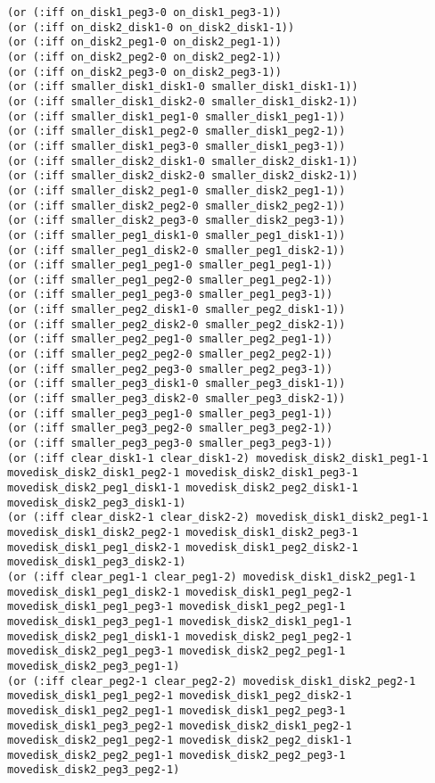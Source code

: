 \documentclass[12pt,letterpaper]{ntdhw}
\begin{document}
\begin{enumerate}
\begin{enumerate}
\begin{lstlisting}[language=pddl, style=pddlstyle,
  basicstyle=\scriptsize]
(or (:iff on_disk1_peg3-0 on_disk1_peg3-1))
(or (:iff on_disk2_disk1-0 on_disk2_disk1-1))
(or (:iff on_disk2_peg1-0 on_disk2_peg1-1))
(or (:iff on_disk2_peg2-0 on_disk2_peg2-1))
(or (:iff on_disk2_peg3-0 on_disk2_peg3-1))
(or (:iff smaller_disk1_disk1-0 smaller_disk1_disk1-1))
(or (:iff smaller_disk1_disk2-0 smaller_disk1_disk2-1))
(or (:iff smaller_disk1_peg1-0 smaller_disk1_peg1-1))
(or (:iff smaller_disk1_peg2-0 smaller_disk1_peg2-1))
(or (:iff smaller_disk1_peg3-0 smaller_disk1_peg3-1))
(or (:iff smaller_disk2_disk1-0 smaller_disk2_disk1-1))
(or (:iff smaller_disk2_disk2-0 smaller_disk2_disk2-1))
(or (:iff smaller_disk2_peg1-0 smaller_disk2_peg1-1))
(or (:iff smaller_disk2_peg2-0 smaller_disk2_peg2-1))
(or (:iff smaller_disk2_peg3-0 smaller_disk2_peg3-1))
(or (:iff smaller_peg1_disk1-0 smaller_peg1_disk1-1))
(or (:iff smaller_peg1_disk2-0 smaller_peg1_disk2-1))
(or (:iff smaller_peg1_peg1-0 smaller_peg1_peg1-1))
(or (:iff smaller_peg1_peg2-0 smaller_peg1_peg2-1))
(or (:iff smaller_peg1_peg3-0 smaller_peg1_peg3-1))
(or (:iff smaller_peg2_disk1-0 smaller_peg2_disk1-1))
(or (:iff smaller_peg2_disk2-0 smaller_peg2_disk2-1))
(or (:iff smaller_peg2_peg1-0 smaller_peg2_peg1-1))
(or (:iff smaller_peg2_peg2-0 smaller_peg2_peg2-1))
(or (:iff smaller_peg2_peg3-0 smaller_peg2_peg3-1))
(or (:iff smaller_peg3_disk1-0 smaller_peg3_disk1-1))
(or (:iff smaller_peg3_disk2-0 smaller_peg3_disk2-1))
(or (:iff smaller_peg3_peg1-0 smaller_peg3_peg1-1))
(or (:iff smaller_peg3_peg2-0 smaller_peg3_peg2-1))
(or (:iff smaller_peg3_peg3-0 smaller_peg3_peg3-1))
(or (:iff clear_disk1-1 clear_disk1-2) movedisk_disk2_disk1_peg1-1 movedisk_disk2_disk1_peg2-1 movedisk_disk2_disk1_peg3-1 movedisk_disk2_peg1_disk1-1 movedisk_disk2_peg2_disk1-1 movedisk_disk2_peg3_disk1-1)
(or (:iff clear_disk2-1 clear_disk2-2) movedisk_disk1_disk2_peg1-1 movedisk_disk1_disk2_peg2-1 movedisk_disk1_disk2_peg3-1 movedisk_disk1_peg1_disk2-1 movedisk_disk1_peg2_disk2-1 movedisk_disk1_peg3_disk2-1)
(or (:iff clear_peg1-1 clear_peg1-2) movedisk_disk1_disk2_peg1-1 movedisk_disk1_peg1_disk2-1 movedisk_disk1_peg1_peg2-1 movedisk_disk1_peg1_peg3-1 movedisk_disk1_peg2_peg1-1 movedisk_disk1_peg3_peg1-1 movedisk_disk2_disk1_peg1-1 movedisk_disk2_peg1_disk1-1 movedisk_disk2_peg1_peg2-1 movedisk_disk2_peg1_peg3-1 movedisk_disk2_peg2_peg1-1 movedisk_disk2_peg3_peg1-1)
(or (:iff clear_peg2-1 clear_peg2-2) movedisk_disk1_disk2_peg2-1 movedisk_disk1_peg1_peg2-1 movedisk_disk1_peg2_disk2-1 movedisk_disk1_peg2_peg1-1 movedisk_disk1_peg2_peg3-1 movedisk_disk1_peg3_peg2-1 movedisk_disk2_disk1_peg2-1 movedisk_disk2_peg1_peg2-1 movedisk_disk2_peg2_disk1-1 movedisk_disk2_peg2_peg1-1 movedisk_disk2_peg2_peg3-1 movedisk_disk2_peg3_peg2-1)

\end{lstlisting}
\end{enumerate}
\end{enumerate}
\end{document}
